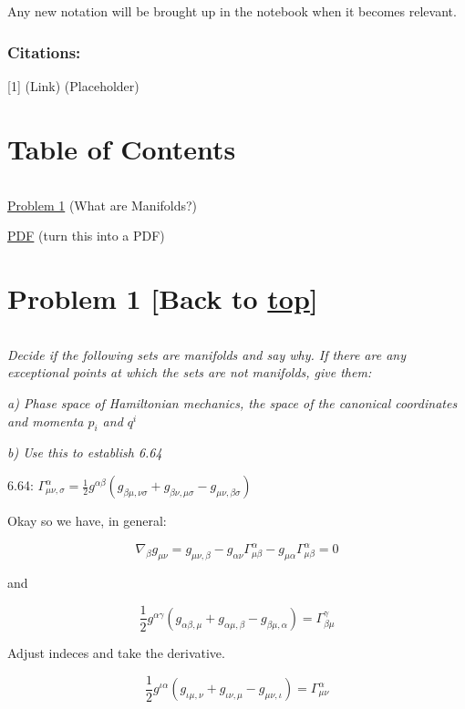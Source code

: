 \documentclass[landscape,letterpaper,10pt,english]{article}
\begin{document}
Any new notation will be brought up in the notebook when it becomes
relevant.

\hypertarget{citations}{%
\subsubsection{Citations:}\label{citations}}

{[}1{]} (Link) (Placeholder)

    \hypertarget{table-of-contents}{%
\section{Table of Contents}\label{table-of-contents}}

\[\label{toc}\]

\hyperref[p1]{Problem 1} (What are Manifolds?)

\hyperref[latex_pdf_output]{PDF} (turn this into a PDF)

    \hypertarget{problem-1-back-to-top}{%
\section{\texorpdfstring{Problem 1 {[}Back to
\hyperref[toc]{top}{]}}{Problem 1 {[}Back to {]}}}\label{problem-1-back-to-top}}

\[\label{P1}\]

\emph{Decide if the following sets are manifolds and say why. If there
are any exceptional points at which the sets are not manifolds, give
them:}

\emph{a) Phase space of Hamiltonian mechanics, the space of the
canonical coordinates and momenta \(p_i\) and \(q^i\)}

    \emph{b) Use this to establish 6.64}

    6.64:
\(\Gamma^\alpha_{\mu\nu,\sigma} = \frac12 g^{\alpha\beta} \left( g_{\beta\mu,\nu\sigma} + g_{\beta\nu,\mu\sigma} - g_{\mu\nu,\beta\sigma} \right)\)

    Okay so we have, in general:

\[ \nabla_\beta g_{\mu\nu} = g_{\mu\nu,\beta} - g_{\alpha\nu}\Gamma^\alpha_{\mu\beta} - g_{\mu\alpha}\Gamma^\alpha_{\mu\beta} = 0 \]

and

\[\frac{1}{2} g^{\alpha\gamma} (g_{\alpha\beta,\mu} + g_{\alpha\mu,\beta} - g_{\beta\mu,\alpha}) =\Gamma^\gamma_{\beta\mu}\]

    Adjust indeces and take the derivative.

\[\frac{1}{2} g^{\iota\alpha} (g_{\iota\mu,\nu} + g_{\iota\nu,\mu} - g_{\mu\nu,\iota}) =\Gamma^\alpha_{\mu\nu}\]
\end{document}
